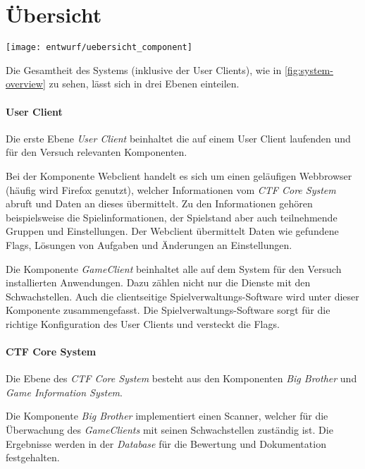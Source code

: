 \section{Übersicht} \label{sec:Übersicht}
\begin{center}
	\texttt{[image: entwurf/uebersicht\_component]}
	\label{fig:system-overview}
\end{center}

Die Gesamtheit des Systems (inklusive der User Clients), wie in \autoref{fig:system-overview} zu sehen, lässt sich in drei Ebenen einteilen.

\paragraph{User Client}
Die erste Ebene \textit{User Client} beinhaltet die auf einem User Client laufenden und für den Versuch relevanten Komponenten.

Bei der Komponente Webclient handelt es sich um einen geläufigen Webbrowser (häufig wird Firefox genutzt), welcher Informationen vom \textit{CTF Core System} abruft und Daten an dieses übermittelt.
Zu den Informationen gehören beispielsweise die Spielinformationen, der Spielstand aber auch teilnehmende Gruppen und Einstellungen. Der Webclient übermittelt Daten wie gefundene Flags, Lösungen von Aufgaben und Änderungen an Einstellungen.

Die Komponente \textit{GameClient} beinhaltet alle auf dem System für den Versuch installierten Anwendungen. Dazu zählen nicht nur die Dienste mit den Schwachstellen. Auch die clientseitige Spielverwaltungs-Software wird unter dieser Komponente zusammengefasst. Die Spielverwaltungs-Software sorgt für die richtige Konfiguration des User Clients und versteckt die Flags.

\paragraph{CTF Core System}
Die Ebene des \textit{CTF Core System} besteht aus den Komponenten \textit{Big Brother} und \textit{Game Information System}. 

Die Komponente \textit{Big Brother} implementiert einen Scanner, welcher für die Überwachung des \textit{GameClients} mit seinen Schwachstellen zuständig ist. Die Ergebnisse werden in der \textit{Database} für die Bewertung und Dokumentation festgehalten.

